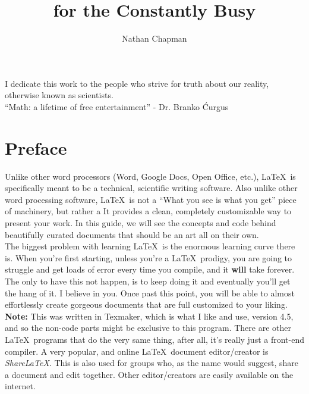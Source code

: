 \documentclass[11pt,letterpaper,twoside,titlepage]{article}
\author{Nathan Chapman}
\title{\latex for the Constantly Busy}
\newcommand{\latex}{\LaTeX \ }
\newenvironment{dedication}
  {%
   \thispagestyle{empty}%
   \vspace*{\stretch{1}}%
   \itshape             %
   \raggedleft          %
  }
  {\par %
   \vspace{\stretch{3}} %
   \clearpage           %
  }
\begin{document}
	\maketitle
	
	\begin{dedication}
	
		I dedicate this work to the people who strive for truth about our reality, otherwise known as scientists. \\
		
		``Math: a lifetime of free entertainment''
		- Dr. Branko \'{C}urgus
	
	\end{dedication}
	
	\section*{Preface}
	
		Unlike other word processors (Word, Google Docs, Open Office, etc.), \latex is specifically meant to be a technical, scientific writing software.  Also unlike other word processing software, \latex is not a ``What you see is what you get'' piece of machinery, but rather a   It provides a clean, completely customizable way to present your work.  In this guide, we will see the concepts and code behind beautifully curated documents that should be an art all on their own. \\
		
		The biggest problem with learning \latex is the enormous learning curve there is.  When you're first starting, unless you're a \latex prodigy, you are going to struggle and get loads of error every time you compile, and it \textbf{will} take forever.  The only to have this not happen, is to keep doing it and eventually you'll get the hang of it.  I believe in you.  Once past this point, you will be able to almost effortlessly create gorgeous documents that are full customized to your liking. \\
		
		\textbf{Note:} This was written in Texmaker, which is what I like and use, version 4.5, and so the non-code parts might be exclusive to this program.  There are other \latex programs that do the very same thing, after all, it's really just a front-end compiler.  A very popular, and online \latex document editor/creator is \emph{ShareLaTeX}.  This is also used for groups who, as the name would suggest, share a document and edit together.  Other editor/creators are easily available on the internet. \\
		
\end{document}
